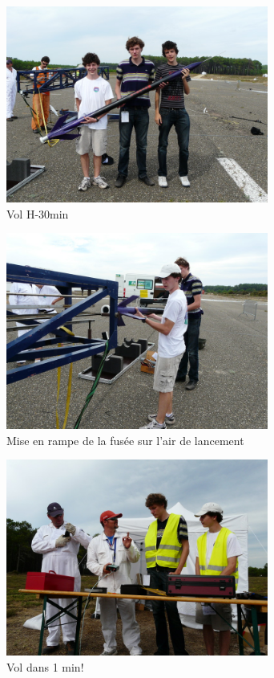 \documentclass[a4paper,12pt]{scrartcl}
\begin{document}
      	      \begin{figure}[H]
		    \begin{center}
		      \caption{Vol H-30min}
		      \includegraphics[height=244px, width=326px]{Photos_Mercury/pre_vol.jpg}
		    \end{center}
	      \end{figure}
      	      \begin{figure}[H]
		    \begin{center}
		      \caption{Mise en rampe de la fusée sur l'air de lancement}
		      \includegraphics[height=244px, width=326px]{Photos_Mercury/miseenrampe.jpg}
		    \end{center}
	      \end{figure}
      	      \begin{figure}[H]
		    \begin{center}
		      \caption{Vol dans 1 min!}
		      \includegraphics[height=244px, width=326px]{Photos_Mercury/volj-10s.jpg}
		    \end{center}
	      \end{figure}
\end{document}
